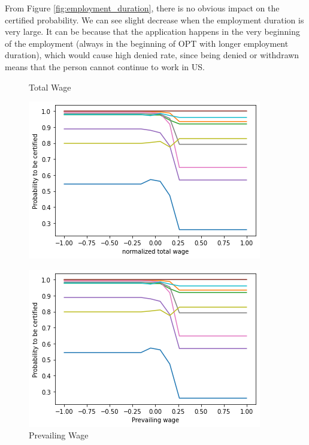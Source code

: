 \documentclass{article}
\begin{document}
From Figure \ref{fig:employment_duration}, there is no obvious impact on the certified probability. We can see slight decrease when the employment duration is very large. It can be because that the application happens in the very beginning of the employment (always in the beginning of OPT with longer employment duration), which would cause high denied rate, since being denied or withdrawn means that the person cannot continue to work in US. 
\begin{figure}[H]
\centering
    \begin{minipage}{.30\textwidth}
        \centering
        \caption{Total Wage}
        \includegraphics[width = \textwidth]{figures/total_wage.png}
        \label{fig:total_wage}
    \end{minipage}
    \begin{minipage}{.31\textwidth}
        \centering
        \caption{Prevailing Wage}
        \includegraphics[width = \textwidth]{figures/prevailing_wage.png}

\end{minipage}
\end{figure}
\end{document}
